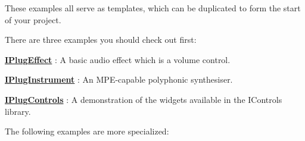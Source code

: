 These examples all serve as templates, which can be duplicated to form the start of your project.

There are three examples you should check out first\+:


\begin{DoxyItemize}
\item {\bfseries{\mbox{\hyperlink{class_i_plug_effect}{I\+Plug\+Effect}}}} \+: A basic audio effect which is a volume control.
\item {\bfseries{\mbox{\hyperlink{class_i_plug_instrument}{I\+Plug\+Instrument}}}} \+: An M\+P\+E-\/capable polyphonic synthesiser.
\item {\bfseries{\mbox{\hyperlink{class_i_plug_controls}{I\+Plug\+Controls}}}} \+: A demonstration of the widgets available in the I\+Controls library.
\end{DoxyItemize}

The following examples are more specialized\+:


